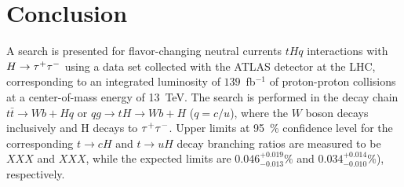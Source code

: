 \section{Conclusion}
\label{sec:conclusion}

A search is presented for flavor-changing neutral currents $tHq$ interactions with $H\to\tau^{+}\tau^{-}$ using a data set collected with the ATLAS
detector at the LHC, corresponding to an integrated luminosity of $139$~fb$^{-1}$ of proton-proton collisions at a center-of-mass energy of 13~TeV.
The search is performed in the decay chain $t\bar{t} \to Wb+Hq$ or $qg \to tH \to Wb+H$ ($q=c/u$), where the $W$ boson decays inclusively and
H decays to $\tau^{+}\tau^{-}$. Upper limits at 95~\% confidence level for the corresponding $t\to cH$ and $t\to uH$ decay branching ratios are measured
to be $XXX$ and $XXX$, while the expected limits are $0.046^{+0.019}_{-0.013}\%$ and $0.034^{+0.014}_{-0.010}\%$), respectively.
